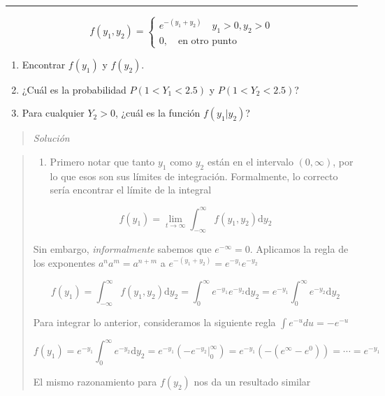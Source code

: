 \documentclass[
  letterpaper,
  DIV=11,
  numbers=noendperiod]{scrartcl}
\providecommand{\tightlist}{%
  \setlength{\itemsep}{0pt}\setlength{\parskip}{0pt}}\usepackage{longtable,booktabs,array}
\begin{document}
\begin{center}\rule{0.5\linewidth}{0.5pt}\end{center}

\[
  f(y_1, y_2) = \begin{cases}
    e^{-(y_1 + y_2)}\quad y_1>0, y_2>0\\
    0,\quad \text{en otro punto}
  \end{cases}
\]

\begin{enumerate}
\def\labelenumi{\alph{enumi})}
\item
  Encontrar \(f(y_1)\) y \(f(y_2)\).
\item
  ¿Cuál es la probabilidad \(P(1 < Y_1 < 2.5)\) y \(P(1 < Y_2 < 2.5)\)?
\item
  Para cualquier \(Y_2>0\), ¿cuál es la función \(f(y_1|y_2)\)?
\end{enumerate}

\begin{quote}
\emph{Solución}
\end{quote}

\begin{quote}
\begin{enumerate}
\def\labelenumi{\alph{enumi})}
\tightlist
\item
  Primero notar que tanto \(y_1\) como \(y_2\) están en el intervalo
  \((0, \infty)\), por lo que esos son sus límites de integración.
  Formalmente, lo correcto sería encontrar el límite de la integral
\end{enumerate}

\[
 f(y_1)=\lim_{t\rightarrow \infty}\int_{-\infty}^{\infty}f(y_1,y_2)\text{d}y_2
\]

Sin embargo, \emph{informalmente} sabemos que \(e^{-\infty}=0\).
Aplicamos la regla de los exponentes \(a^na^m=a^{n+m}\) a
\(e^{-(y_1+y_2)}=e^{-y_1}e^{-y_2}\)

\[
 f(y_1)=\int_{-\infty}^{\infty}f(y_1,y_2)\text{d}y_2=\int_0^{\infty}e^{-y_1}e^{-y_2}\text{d}y_2=e^{-y_1}\int_0^{\infty}e^{-y_2}\text{d}y_2
\]

Para integrar lo anterior, consideramos la siguiente regla
\(\int e^{-u}du=-e^{-u}\)

\[
 f(y_1) = e^{-y_1}\int_0^{\infty}e^{-y_2}\text{d}y_2=e^{-y_1}\left(-e^{-y_2}\Big|_0^\infty\right)=e^{-y_1}\left(-(e^\infty-e^0)\right)=\cdots=e^{-y_1}
\]

El mismo razonamiento para \(f(y_2)\) nos da un resultado similar
\end{quote}
\end{document}
